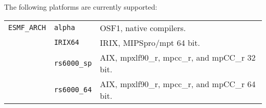 

The following platforms are currently supported:

\begin{tabular}{lll}
{\tt ESMF\_ARCH}  & {\tt alpha}      &  OSF1, native compilers. \\
                  & {\tt IRIX64}     &  IRIX, MIPSpro/mpt 64 bit. \\
                  & {\tt rs6000\_sp}  &  AIX, mpxlf90\_r, mpcc\_r, and mpCC\_r 32 bit.  \\
                  & {\tt rs6000\_64}  &  AIX, mpxlf90\_r, mpcc\_r, and mpCC\_r
64 bit.  \\
\end{tabular}
